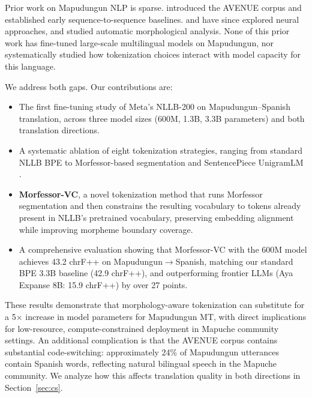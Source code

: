 \documentclass[11pt]{article}
\begin{document}
Prior work on Mapudungun NLP is sparse. \citet{duan2020avenue} introduced the AVENUE corpus and established early sequence-to-sequence baselines. \citet{pendas2023} and \citet{liranmt2025} have since explored neural approaches, and \citet{chandia2022} studied automatic morphological analysis. None of this prior work has fine-tuned large-scale multilingual models on Mapudungun, nor systematically studied how tokenization choices interact with model capacity for this language.

We address both gaps. Our contributions are:

\begin{itemize}
  \item The first fine-tuning study of Meta's NLLB-200 \cite{nllbteam2022} on Mapudungun--Spanish translation, across three model sizes (600M, 1.3B, 3.3B parameters) and both translation directions.

  \item A systematic ablation of eight tokenization strategies, ranging from standard NLLB BPE to Morfessor-based segmentation \cite{virpioja2013morfessor} and SentencePiece UnigramLM \cite{kudo2018subword}.

  \item \textbf{Morfessor-VC}, a novel tokenization method that runs Morfessor segmentation and then constrains the resulting vocabulary to tokens already present in NLLB's pretrained vocabulary, preserving embedding alignment while improving morpheme boundary coverage.

  \item A comprehensive evaluation showing that Morfessor-VC with the 600M model achieves 43.2 chrF++ on Mapudungun$\rightarrow$Spanish, matching our standard BPE 3.3B baseline (42.9 chrF++), and outperforming frontier LLMs (Aya Expanse 8B: 15.9 chrF++) by over 27 points.
\end{itemize}

These results demonstrate that morphology-aware tokenization can substitute for a 5$\times$ increase in model parameters for Mapudungun MT, with direct implications for low-resource, compute-constrained deployment in Mapuche community settings. An additional complication is that the AVENUE corpus contains substantial code-switching: approximately 24\% of Mapudungun utterances contain Spanish words, reflecting natural bilingual speech in the Mapuche community. We analyze how this affects translation quality in both directions in Section~\ref{sec:cs}.

\end{document}
